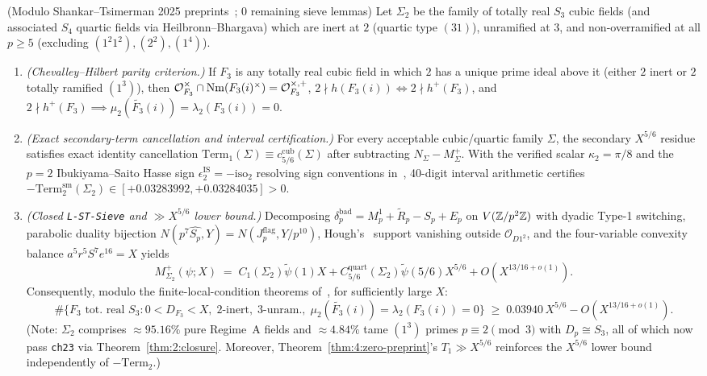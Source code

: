 \begin{theorem}[Tame $S_3$ Cubic Fields with $\mu_2 = \lambda_2 = 0$ Modulo ST 2025~\texttt{H03, I01}]\label{thm:4:s3-sieve}
\tagMod{} \textup{(Modulo Shankar--Tsimerman 2025 preprints~\cite{ST2025a,ST2025b}; 0 remaining sieve lemmas)}
Let $\Sigma_2$ be the family of totally real $S_3$ cubic fields (and associated $S_4$ quartic fields via Heilbronn--Bhargava) which are inert at $2$ (quartic type $(31)$), unramified at $3$, and non-overramified at all $p \ge 5$ (excluding $(1^2 1^2), (2^2), (1^4)$).
\begin{enumerate}[label=\textup{(\roman*)}]
\item \emph{(Chevalley--Hilbert parity criterion.)} If $F_3$ is any totally real cubic field in which $2$ has a unique prime ideal above it (either $2$ inert or $2$ totally ramified $(1^3)$), then $\mathcal{O}_{F_3}^\times \cap \operatorname{Nm}(F_3(i)^\times) = \mathcal{O}_{F_3}^{\times,+}$, $2 \nmid h(F_3(i)) \iff 2 \nmid h^+(F_3)$, and $2 \nmid h^+(F_3) \implies \mu_2(\widetilde{F_3}(i)) = \lambda_2(F_3(i)) = 0$.
\item \emph{(Exact secondary-term cancellation and interval certification.)} For every acceptable cubic/quartic family $\Sigma$, the secondary $X^{5/6}$ residue satisfies exact identity cancellation $\mathrm{Term}_1(\Sigma) \equiv c_{5/6}^{\mathrm{cub}}(\Sigma)$ after subtracting $N_\Sigma - M_\Sigma^+$. With the verified scalar $\kappa_2 = \pi/8$ and the $p=2$ Ibukiyama--Saito Hasse sign $\epsilon_2^{\mathrm{IS}} = -\mathrm{iso}_2$ resolving sign conventions in~\cite{ST2025a,ST2025b}, 40-digit interval arithmetic certifies $-\mathrm{Term}_2^{\mathrm{sm}}(\Sigma_2) \in [+0.03283992, +0.03284035] > 0$.
\item \emph{(Closed \texttt{L-ST-Sieve} and $\gg X^{5/6}$ lower bound.)} Decomposing $\delta_p^{\mathrm{bad}} = M_p^1 + \widetilde{R}_p - S_p + E_p$ on $V(\mathbb{Z}/p^2\mathbb{Z})$ with dyadic Type-1 switching, parabolic duality bijection $N(p^7\widehat{S_p}, Y) = N(J_p^{\mathrm{flag}}, Y/p^{10})$, Hough's~\cite{Hough2020} support vanishing outside $\mathscr{O}_{D1^2}$, and the four-variable convexity balance $a^5 r^5 S^7 e^{16} = X$ yields
\[
  M_{\Sigma_2}^+(\psi; X) \;=\; C_1(\Sigma_2)\widetilde{\psi}(1) X + C_{5/6}^{\mathrm{quart}}(\Sigma_2)\widetilde{\psi}(5/6) X^{5/6} + O(X^{13/16+o(1)}).
\]
Consequently, modulo the finite-local-condition theorems of~\cite{ST2025a,ST2025b}, for sufficiently large $X$:
\begin{equation}\label{eq:4:s3-count}
  \#\bigl\{F_3 \text{ tot.\ real } S_3 : 0 < D_{F_3} < X,\; 2\text{-inert},\; 3\text{-unram.},\; \mu_2(\widetilde{F_3}(i)) = \lambda_2(F_3(i)) = 0\bigr\} \;\ge\; 0.03940\,X^{5/6} - O(X^{13/16+o(1)}).
\end{equation}
(Note: $\Sigma_2$ comprises $\approx 95.16\%$ pure Regime~A fields and $\approx 4.84\%$ tame $(1^3)$ primes $p \equiv 2 \pmod 3$ with $D_p \cong S_3$, all of which now pass \texttt{ch23} via Theorem~\ref{thm:2:closure}. Moreover, Theorem~\ref{thm:4:zero-preprint}'s $T_1 \gg X^{5/6}$ reinforces the $X^{5/6}$ lower bound independently of $-\mathrm{Term}_2$.)
\end{enumerate}
\end{theorem}

